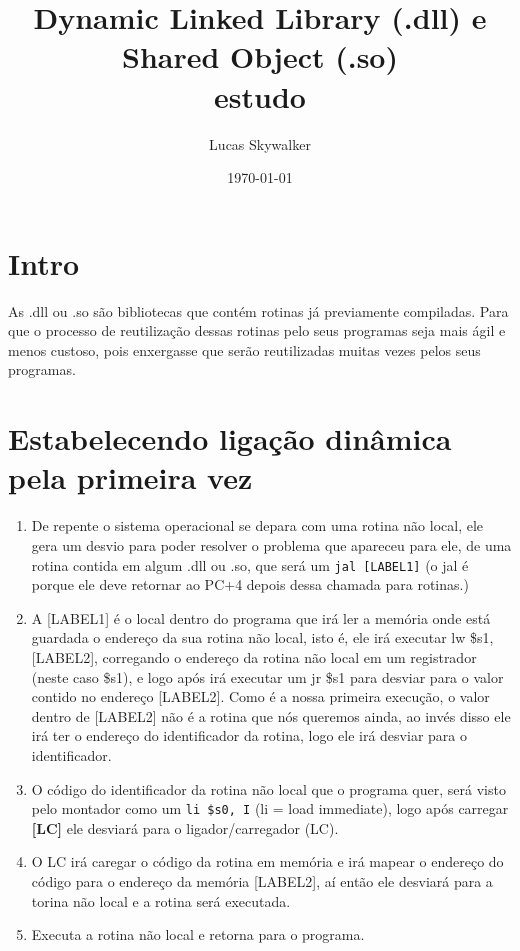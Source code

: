 \documentclass{article}
\author {
  Lucas Skywalker
}
\title {
  Dynamic Linked Library (.dll) e Shared Object (.so)\\
  {
    \small estudo
  }
}
\date{\today}
\begin{document}
\maketitle

\section{Intro}
As .dll ou .so são bibliotecas que contém rotinas já previamente compiladas. 
Para que o processo de reutilização dessas rotinas pelo seus programas seja mais
ágil e menos custoso, pois enxergasse que serão reutilizadas muitas vezes pelos 
seus programas.

\section{Estabelecendo ligação dinâmica pela primeira vez}

  \begin{enumerate}
    \item De repente o sistema operacional se depara com uma rotina não local,
    ele gera um desvio para poder resolver o problema que apareceu para ele, de
    uma rotina contida em algum .dll ou .so, que será um \verb|jal [LABEL1]| (o
    jal é porque ele deve retornar ao PC+4 depois dessa chamada para rotinas.)

    \item A [LABEL1] é o local dentro do programa que irá ler a memória onde
    está guardada o endereço da sua rotina não local, isto é, ele irá executar
    lw \$s1, [LABEL2], corregando o endereço da rotina não local em um
    registrador (neste caso \$s1), e logo após irá executar um jr \$s1 para
    desviar para o valor contido no endereço [LABEL2]. Como é a nossa primeira
    execução, o valor dentro de [LABEL2] não é a rotina que nós queremos ainda,
    ao invés disso ele irá ter o endereço do identificador da rotina, logo ele
    irá desviar para o identificador.

    \item O código do identificador da rotina não local que o programa quer,
    será visto pelo montador como um \verb|li $s0, I| (li = load immediate), 
    logo após carregar \textbf{[LC]} ele desviará para o ligador/carregador 
    (LC).

    \item O LC irá caregar o código da rotina em memória e irá mapear o endereço
    do código para o endereço da memória [LABEL2], aí então ele desviará para a
    torina não local e a rotina será executada.

    \item Executa a rotina não local e retorna para o programa.
  \end{enumerate}
\end{document}

